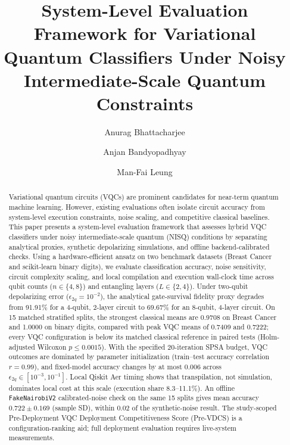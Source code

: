 \documentclass[final,5p,times,number]{elsarticle}
\begin{document}

\begin{frontmatter}

\title{System-Level Evaluation Framework for Variational Quantum Classifiers Under Noisy Intermediate-Scale Quantum Constraints}

\author[inst1]{Anurag Bhattacharjee}
\author[inst2]{Anjan Bandyopadhyay}
\author[inst3]{Man-Fai Leung}

\address[inst1]{University of Birmingham, Birmingham, United Kingdom}
\address[inst2]{KIIT Deemed to be University, Bhubaneswar, India}
\address[inst3]{University of Reading, Reading, United Kingdom}

\begin{abstract}

Variational quantum circuits (VQCs) are prominent candidates for near-term quantum machine learning. However, existing evaluations often isolate circuit accuracy from system-level execution constraints, noise scaling, and competitive classical baselines. This paper presents a system-level evaluation framework that assesses hybrid VQC classifiers under noisy intermediate-scale quantum (NISQ) conditions by separating analytical proxies, synthetic depolarizing simulations, and offline backend-calibrated checks. Using a hardware-efficient ansatz on two benchmark datasets (Breast Cancer and scikit-learn binary digits), we evaluate classification accuracy, noise sensitivity, circuit complexity scaling, and local compilation and execution wall-clock time across qubit counts ($n \in \{4, 8\}$) and entangling layers ($L \in \{2, 4\}$). Under two-qubit depolarizing error ($\epsilon_{2q} = 10^{-2}$), the analytical gate-survival fidelity proxy degrades from 91.91\% for a 4-qubit, 2-layer circuit to 69.67\% for an 8-qubit, 4-layer circuit. On 15 matched stratified splits, the strongest classical means are 0.9708 on Breast Cancer and 1.0000 on binary digits, compared with peak VQC means of 0.7409 and 0.7222; every VQC configuration is below its matched classical reference in paired tests (Holm-adjusted Wilcoxon $p \le 0.0015$). With the specified 20-iteration SPSA budget, VQC outcomes are dominated by parameter initialization (train--test accuracy correlation $r = 0.99$), and fixed-model accuracy changes by at most 0.006 across $\epsilon_{2q} \in [10^{-3}, 10^{-1}]$. Local Qiskit Aer timing shows that transpilation, not simulation, dominates local cost at this scale (execution share 8.3--11.1\%). An offline \texttt{FakeNairobiV2} calibrated-noise check on the same 15 splits gives mean accuracy $0.722 \pm 0.169$ (sample SD), within 0.02 of the synthetic-noise result. The study-scoped Pre-Deployment VQC Deployment Competitiveness Score (Pre-VDCS) is a configuration-ranking aid; full deployment evaluation requires live-system measurements.


\end{abstract}
\end{frontmatter}
\end{document}
